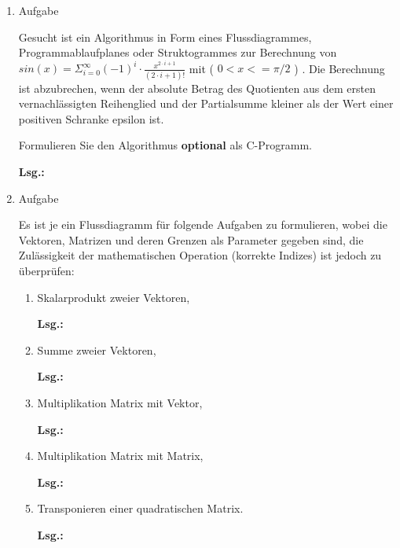 \documentclass[12pt,a4paper,ngerman]{scrreprt}
\newcommand{\Lsg}{\par \textbf{Lsg.: } \hfill}
\begin{document}
\begin{enumerate}
\item Aufgabe %

Gesucht ist ein Algorithmus in Form eines Flussdiagrammes, Programmablaufplanes oder Struktogrammes zur Berechnung von
\begin{math}
sin(x)=\Sigma_{i=0}^{\infty} (-1)^i \cdot \frac{x^{2 \cdot i+1}}{(2 \cdot i + 1)!}
\end{math}
mit ( $0 < x <= \pi/2$ ) . Die Berechnung ist abzubrechen, wenn der absolute Betrag des Quotienten
aus dem ersten vernachlässigten Reihenglied und der Partialsumme kleiner als der Wert einer
positiven Schranke epsilon ist. \par Formulieren Sie den Algorithmus \textbf{optional} als C-Programm.

\Lsg

\item Aufgabe %

Es ist je ein Flussdiagramm für folgende Aufgaben zu formulieren, wobei die Vektoren, Matrizen und deren Grenzen als Parameter gegeben sind, die Zulässigkeit der mathematischen Operation (korrekte Indizes) ist jedoch zu überprüfen:

\begin{enumerate}
\item Skalarprodukt zweier Vektoren,

\Lsg

\item Summe zweier Vektoren,

\Lsg

\item Multiplikation Matrix mit Vektor,

\Lsg

\item Multiplikation Matrix mit Matrix,

\Lsg


\item Transponieren einer quadratischen Matrix.

\Lsg


\end{enumerate}
\end{enumerate}
\end{document}
